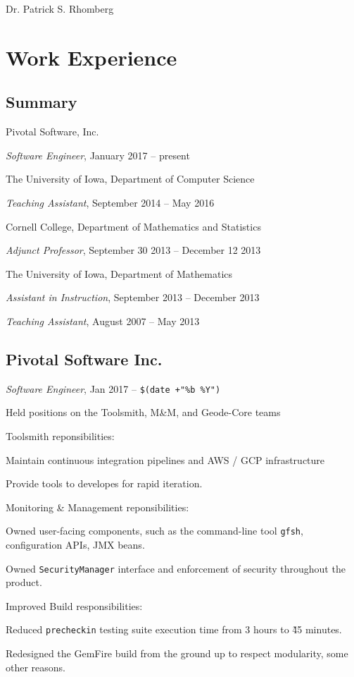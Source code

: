 \documentclass[10pt,letterpaper]{article}
\newcommand{\jobEntryTitle}[1]{\item #1}
\newcommand{\jobEntryEntry}[2]{\par\vspace{-.2em}\quad \textit{#1}, #2}
\newcommand{\jobEntry}[3]{\jobEntryTitle{#1}\jobEntryEntry{#2}{#3}}
\def\name{Dr. Patrick S. Rhomberg}
\renewenvironment{itemize}{
  \begin{list}{}{
    \setlength{\leftmargin}{1.5em}
    \setlength{\itemsep}{0.25em}
    \setlength{\parskip}{0pt}
    \setlength{\parsep}{0.25em}
  }
}{
  \end{list}
}
\begin{document}
{\huge \name}
\bigskip



\section*{Work Experience}
\subsection*{Summary}
\begin{itemize}
  \jobEntry{Pivotal Software, Inc.}{Software Engineer}{January 2017 -- present}
  \jobEntry{The University of Iowa, Department of Computer Science}{Teaching Assistant}{September 2014 -- May 2016}
  \jobEntry{Cornell College, Department of Mathematics and Statistics}{Adjunct Professor}{September 30 2013 -- December 12 2013}
  \jobEntryTitle{The University of Iowa, Department of Mathematics}
  \jobEntryEntry{Assistant in Instruction}{September 2013 -- December 2013}
  \jobEntryEntry{Teaching Assistant}{August 2007 -- May 2013}
\end{itemize}


\subsection*{Pivotal Software Inc.}
\textit{Software Engineer}, Jan 2017 -- \verb!$(date +"%b %Y")!
\begin{itemize}
  \item Held positions on the Toolsmith, M\&M, and Geode-Core teams
  \begin{itemize}
    \item Toolsmith reponsibilities:
    \begin{itemize}
      \item Maintain continuous integration pipelines and AWS / GCP infrastructure
      \item Provide tools to developes for rapid iteration.
    \end{itemize}
    \item Monitoring \& Management reponsibilities:
    \begin{itemize}
      \item Owned user-facing components, such as the command-line tool \verb!gfsh!, configuration APIs, JMX beans.
      \item Owned \verb!SecurityManager! interface and enforcement of security throughout the product.
    \end{itemize}
    \item Improved Build responsibilities:
    \begin{itemize}
      \item Reduced \verb!precheckin! testing suite execution time from 3 hours to \~45 minutes.
      \item Redesigned the GemFire build from the ground up to respect modularity, some other reasons.
    \end{itemize}
  \end{itemize}
\end{itemize}
\end{document}
